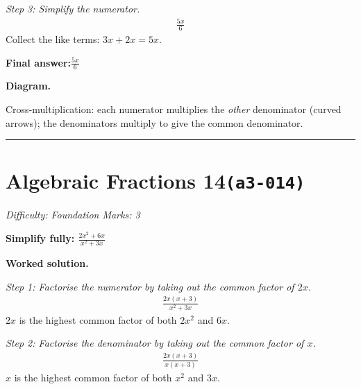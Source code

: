 \documentclass[11pt]{article}
\newcommand{\question}[1]{\par\medskip\noindent\textbf{#1}\par}
\begin{document}
\textit{Step 3: Simplify the numerator.}
\[\begin{gathered}
\frac{5x}{6}
\end{gathered}\]
Collect the like terms: \( 3x + 2x = 5x \).

\begin{answerbox}
\textbf{Final answer:}\quad \(\displaystyle \frac{5x}{6}\)
\end{answerbox}
\textbf{Diagram.}

\begin{center}
\end{center}
\small Cross-multiplication: each numerator multiplies the \emph{other} denominator (curved arrows); the denominators multiply to give the common denominator.\normalsize

\medskip\hrule

\section*{Algebraic Fractions 14\quad\small\texttt{(a3-014)}}
\textit{Difficulty: Foundation \quad\textbar\quad Marks: 3}

\question{Simplify fully: \( \frac{2x^2 + 6x}{x^2 + 3x} \)}

\textbf{Worked solution.}

\textit{Step 1: Factorise the numerator by taking out the common factor of \( 2x \).}
\[\begin{gathered}
\frac{2x(x + 3)}{x^2 + 3x}
\end{gathered}\]
\( 2x \) is the highest common factor of both \( 2x^2 \) and \( 6x \).

\textit{Step 2: Factorise the denominator by taking out the common factor of \( x \).}
\[\begin{gathered}
\frac{2x(x + 3)}{x(x + 3)}
\end{gathered}\]
\( x \) is the highest common factor of both \( x^2 \) and \( 3x \).
\end{document}
